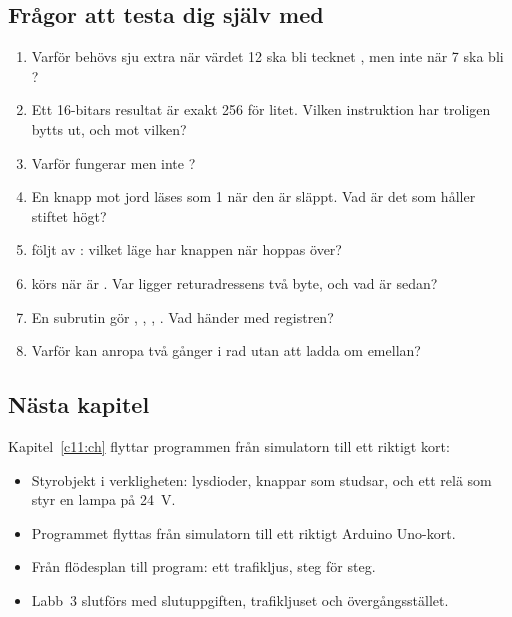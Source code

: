\subsection*{Frågor att testa dig själv med}
\begin{enumerate}
  \item Varför behövs sju extra när värdet 12 ska bli tecknet , men inte när 7 ska bli
    ?
  \item Ett 16-bitars resultat är exakt 256 för litet. Vilken instruktion har troligen bytts ut,
    och mot vilken?
  \item Varför fungerar  men inte ?
  \item En knapp mot jord läses som 1 när den är släppt. Vad är det som håller stiftet högt?
  \item {} följt av : vilket läge har knappen när
     hoppas över?
  \item {} körs när  är . Var ligger returadressens två byte, och
    vad är  sedan?
  \item En subrutin gör , , , . Vad
    händer med registren?
  \item Varför kan  anropa  två gånger i rad utan att ladda om
     emellan?
\end{enumerate}

\subsection*{Nästa kapitel}
Kapitel~\ref{c11:ch} flyttar programmen från simulatorn till ett riktigt kort:
\begin{itemize}
  \item Styrobjekt i verkligheten: lysdioder, knappar som studsar, och ett relä som styr en lampa
    på 24~V.
  \item Programmet flyttas från simulatorn till ett riktigt Arduino Uno-kort.
  \item Från flödesplan till program: ett trafikljus, steg för steg.
  \item Labb~3 slutförs med slutuppgiften, trafikljuset och övergångsstället.
\end{itemize}
